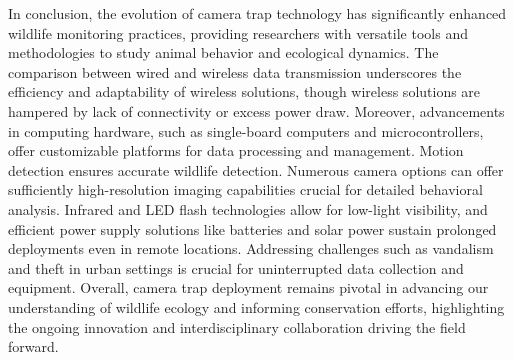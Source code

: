 In conclusion, the evolution of camera trap technology has significantly enhanced wildlife monitoring practices, providing researchers with versatile tools and methodologies to study animal behavior and ecological dynamics. The comparison between wired and wireless data transmission underscores the efficiency and adaptability of wireless solutions, though wireless solutions are hampered by lack of connectivity or excess power draw. Moreover, advancements in computing hardware, such as single-board computers and microcontrollers, offer customizable platforms for data processing and management. Motion detection ensures accurate wildlife detection. Numerous camera options can offer sufficiently high-resolution imaging capabilities crucial for detailed behavioral analysis. Infrared and LED flash technologies allow for low-light visibility, and efficient power supply solutions like batteries and solar power sustain prolonged deployments even in remote locations. Addressing challenges such as vandalism and theft in urban settings is crucial for uninterrupted data collection and equipment. Overall, camera trap deployment remains pivotal in advancing our understanding of wildlife ecology and informing conservation efforts, highlighting the ongoing innovation and interdisciplinary collaboration driving the field forward.

\ifstandalone

\printnoidxglossary[type=\acronymtype,nonumberlist]
\fi

